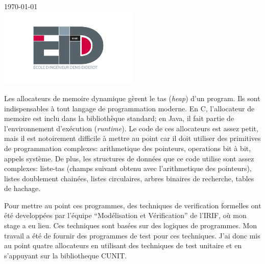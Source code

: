 \documentclass[11pt]{article}
\begin{document}
\begin{titlepage}
{\large \today}\\[0.1cm] %


\includegraphics[width=0.5\textwidth]{figures/eidd.jpeg}\\[0cm] %
 

\vfill %

\end{titlepage}

Les allocateurs de memoire dynamique gèrent le tas (\emph{heap}) d'un program.
Ils sont indispensables à tout langage de programmation moderne. En C, l'allocateur de memoire est inclu dans la bibliothèque standard; en Java, il fait partie de l'environnement d'exécution (\emph{runtime}).
Le code de ces allocateurs est assez petit, mais il est notoirement difficile à mettre au point car il doit utiliser des primitives de programmation complexes: arithmetique des pointeurs, operations bit à bit, appels système. De plus, les structures de données que ce code utilise sont assez complexes: liste-tas (champs suivant obtenu avec l'arithmetique des pointeurs), listes doublement chainées, listes circulaires, arbres binaires de recherche, tables de hachage. 

Pour mettre au point ces programmes, des techniques de verification formelles ont été developpées par l'équipe ``Modélisation et Vérification'' de l'IRIF, où mon stage a eu lieu. Ces techniques sont basées sur des logiques de programmes. Mon travail a été de fournir des programmes de test pour ces techniques.
J'ai donc mis au point quatre allocateurs en utilisant des techniques de test unitaire et en s'appuyant sur la  bibliotheque CUNIT.
\clearpage
\end{document}
